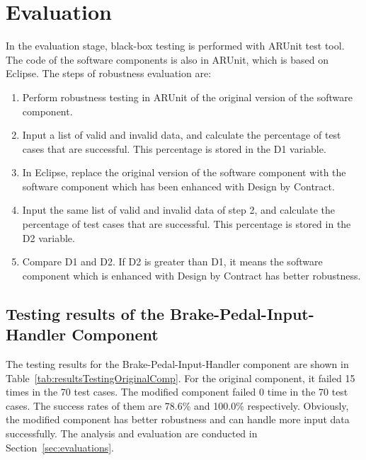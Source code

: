 \section{Evaluation}\label{sec:evaluation}

In the evaluation stage, black-box testing is performed with ARUnit test tool. The code of the software components is also in ARUnit, which is based on Eclipse. The steps of robustness evaluation are: %

\begin{enumerate}
 \item {Perform robustness testing in ARUnit of the original version of the software component.}
 \item {Input a list of valid and invalid data, and calculate the percentage of test cases that are successful. %
 This percentage is stored in the D1 variable.} %
 \item {In Eclipse, replace the original version of the software component with the software component which has been enhanced with Design by Contract.}
 \item {Input the same list of valid and invalid data of step 2, and calculate the percentage of test cases that are successful. %
  This percentage is stored in the D2 variable.} %
 \item {Compare D1 and D2. If D2 is greater than D1, it means the software component which is enhanced with Design by Contract has better robustness.}
\end{enumerate}

\subsection{Testing results of the Brake-Pedal-Input-Handler Component}

The testing results for the Brake-Pedal-Input-Handler component are shown in Table~\ref{tab:resultsTestingOriginalComp}. For the original component, it failed 15 times in the 70 test cases.  The modified component failed 0 time in the 70 test cases. The success rates of them are 78.6\% and 100.0\% respectively. Obviously, the modified component has better robustness and can handle more input data successfully. The analysis and evaluation are conducted in Section~\ref{sec:evaluations}.

